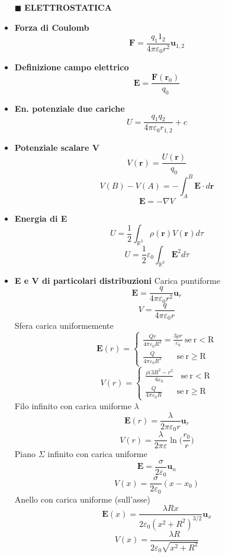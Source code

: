 \documentclass{book}
\newcommand{\g}{\textbf}
\newcommand{\h}{\mathbf}
\newcommand{\e}{\begin{equation}}
\newcommand{\ex}{\end{equation} }
\renewcommand{\it}{\item[$\cdot$]}
\begin{document}
\begin{multicols*}{4}
\begin{itemize}
\item [$\blacksquare$] \g{ELETTROSTATICA}
    \it \g{Forza di Coulomb}
        \e{\h{F}=\frac{q_1 1_2}{4\pi\varepsilon_0 r^2}\h{u}_{1,2}} \ex
    \it \g{Definizione campo elettrico}
        \e{\h{E}=\frac{\h{F}(\h{r}_0)}{q_0}} \ex
    \it \g{En. potenziale due cariche}
        \e{U=\frac{q_1q_2}{4\pi\varepsilon_0r_{1,2}}+c} \ex
    \it \g{Potenziale scalare V}
        \e{V(\h{r})=\frac{U(\h{r})}{q_0}} \ex
        \e{V(B)-V(A)=-\int_A^B\h{E}\cdot d \h{r}} \ex
        \e{\h{E}=-\nabla V} \ex
    \it \g{Energia di E}
        \e{U=\frac{1}{2} \int_{\mathbb{R}^3} \rho(\h{r}) V(\h{r}) d\tau} \ex
        \e{U=\frac{1}{2}\varepsilon_0\int_{\mathbb{R}^3}\h{E}^2 d\tau} \ex
    \it \g{E e V di particolari distribuzioni}
    Carica puntiforme 
        \e{\h{E}=\frac{q}{4\pi\varepsilon_0 r^2}\h{u}_{r}} \ex
        \e{V=\frac{q}{4\pi\varepsilon_0 r}} \ex
    Sfera carica uniformemente
        \e{ \h{E}(r)=\begin{cases} 
        \frac{Qr}{4\pi\varepsilon_0 R^3}=\frac{3 \rho r}{\varepsilon_0} \mathrm{\ se\ r<R}\\
        \frac{Q}{4\pi\varepsilon_0 R^2} \ \ \ \ \ \ \ \mathrm{\ se\ r\geq R}\end{cases} } \ex
        \e{ V(r)=\begin{cases} 
        \frac{\rho (3R^2-r^2}{6\varepsilon_0 } \ \ \  \mathrm{\ se\ r<R}\\
        \frac{Q}{4\pi\varepsilon_0 R} \ \ \ \ \ \ \ \mathrm{\ se\ r\geq R}\end{cases} } \ex
    Filo infinito con carica uniforme $\lambda$
        \e{\h{E}(r)=\frac{\lambda}{2\pi\varepsilon_0 r} \h{u}_r} \ex
        \e{V(r)=\frac{\lambda}{2\pi\varepsilon} \ln \biggl(\frac{r_0}{r}\biggr)} \ex
    Piano $\Sigma$ infinito con carica uniforme
        \e{\h{E}=\frac{\sigma}{2\varepsilon_0} \h{u}_n } \ex
        \e{V(x)=\frac{\sigma}{2\varepsilon_0}(x-x_0)} \ex   
    Anello con carica uniforme (sull’asse)
        \e{\h{E}(x)=\frac{\lambda R x}{2\varepsilon_0(x^2+R^2)^{3/2}} \h{u}_x} \ex
        \e{V(x)=\frac{\lambda R}{2\varepsilon_0\sqrt{x^2+R^2}}} \ex


\end{itemize}
\end{multicols*}
\end{document}
